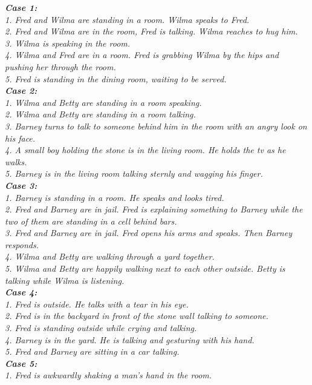 \documentclass[10pt,twocolumn,letterpaper]{article}
\begin{document}
\textit{\footnotesize{\textbf{Case 1:}\\
1. Fred and Wilma are standing in a room. Wilma speaks to Fred.\\
2. Fred and Wilma are in the room, Fred is talking. Wilma reaches to hug him.\\
3. Wilma is speaking in the room.\\
4. Wilma and Fred are in a room. Fred is grabbing Wilma by the hips and pushing her through the room.\\
5. Fred is standing in the dining room, waiting to be served.\\
\textbf{Case 2:}\\
1. Wilma and Betty are standing in a room speaking.\\
2. Wilma and Betty are standing in a room talking.\\
3. Barney turns to talk to someone behind him in the room with an angry look on his face.\\
4. A small boy holding the stone is in the living room. He holds the tv as he walks.\\
5. Barney is in the living room talking sternly and wagging his finger.\\
\textbf{Case 3:}\\
1. Barney is standing in a room. He speaks and looks tired.\\
2. Fred and Barney are in jail. Fred is explaining something to Barney while the two of them are standing in a cell behind bars.\\
3. Fred and Barney are in jail. Fred opens his arms and speaks. Then Barney responds.\\
4. Wilma and Betty are walking through a yard together.\\
5. Wilma and Betty are happily walking next to each other outside. Betty is talking while Wilma is listening.\\
\textbf{Case 4:}\\
1. Fred is outside. He talks with a tear in his eye.\\
2. Fred is in the backyard in front of the stone wall talking to someone.\\
3. Fred is standing outside while crying and talking.\\
4. Barney is in the yard. He is talking and gesturing with his hand.\\
5. Fred and Barney are sitting in a car talking.\\
\textbf{Case 5:}\\
1. Fred is awkwardly shaking a man's hand in the room.\\
}}
\end{document}
